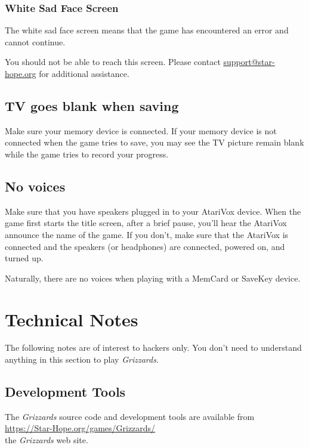 \documentclass[12pt,openright,book]{memoir}
\begin{document}
\begin{description}
\subsection{White Sad Face Screen}

The white sad  face screen means that the game  has encountered an error
and cannot continue. 

You  should   not  be  able   to  reach  this  screen.   Please  contact
\href{mailto:support@star-hope.org}{support@star-hope.org}           for
additional assistance.


\section{TV goes blank when saving}

Make sure your memory device is  connected. If your memory device is not
connected when the game tries to save, you may see the TV picture remain
blank while the game tries to record your progress.

\section{No voices}

Make sure  that you have  speakers plugged  in to your  AtariVox device.
When the game first starts the title screen, after a brief pause, you'll
hear the AtariVox announce the name of the game. If you don't, make sure
that  the AtariVox  is connected  and the  speakers (or  headphones) are
connected, powered on, and turned up.

Naturally,  there  are  no  voices   when  playing  with  a  MemCard  or
SaveKey device. 

\chapter{Technical Notes}

The following notes are of interest to hackers only. You don't need to
understand anything in this section to play \textit{Grizzards}.

\section{Development Tools}

The \textit{Grizzards}  source code and development  tools are available
from \\
\href{https://Star-Hope.org/games/Grizzards/}{https://Star-Hope.org/games/Grizzards/} \\
the \textit{Grizzards} web site.


\end{description}
\end{document}
